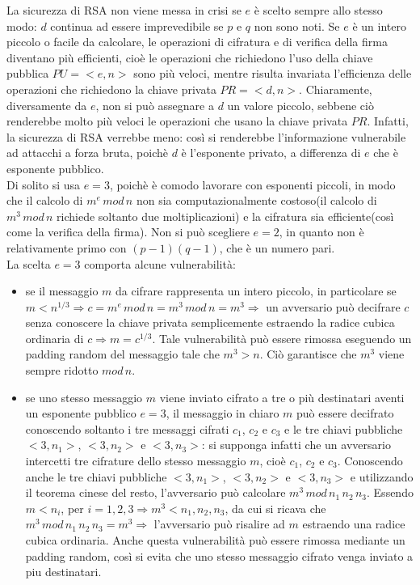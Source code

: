 La sicurezza di RSA non viene messa in crisi se $e$ è scelto sempre allo stesso modo: $d$ continua ad essere imprevedibile se $p$ e $q$ non sono noti. Se $e$ è un intero piccolo o facile da calcolare, le
operazioni di cifratura e di verifica della firma diventano più efficienti, cioè le operazioni che richiedono l'uso della chiave pubblica $PU = <e,n>$ sono più veloci, mentre risulta invariata l'efficienza delle operazioni che richiedono la chiave privata $PR = <d,n>$. Chiaramente, diversamente da $e$, non si può assegnare
a $d$ un valore piccolo, sebbene ciò renderebbe molto più veloci le operazioni che usano la chiave privata $PR$. Infatti, la sicurezza di RSA verrebbe meno: così si renderebbe l'informazione vulnerabile ad attacchi a forza bruta, poichè $d$ è l'esponente privato, a differenza di $e$ che è esponente pubblico.
\\ Di solito si usa $e=3$, poichè è comodo lavorare con esponenti piccoli, in modo che il calcolo di $m^e \, mod \, n$ non sia computazionalmente costoso(il calcolo di $ m^3 \, mod \, n$ richiede soltanto due moltiplicazioni) e la cifratura sia efficiente(così come la verifica della firma). Non si può scegliere $e=2$, in quanto non è relativamente primo con $(p-1)(q-1)$, che è un numero pari. \\
La scelta $e=3$ comporta alcune vulnerabilità: \begin{itemize}
\item se il messaggio $m$ da cifrare rappresenta un intero piccolo, in particolare se $m < n^{1/3} \Rightarrow  c = m^e \, mod \, n = m^3 \, mod \, n = m^3 \Rightarrow$ un avversario può decifrare $c$ senza conoscere la chiave privata semplicemente estraendo la radice
cubica ordinaria di $c \Rightarrow m = c^{1/3}$. Tale vulnerabilità può essere rimossa eseguendo un padding random del messaggio tale che $m^3 > n$. Ciò garantisce che $m^3$ viene sempre ridotto $ mod \, n $.
\item se uno stesso messaggio $m$ viene inviato cifrato a tre o più destinatari aventi un esponente pubblico $e=3$, il messaggio in chiaro $m$ può essere decifrato conoscendo soltanto i tre messaggi cifrati $c_{1}$, $c_{2}$ e $c_{3}$ e le tre chiavi pubbliche $<3,n_{1}>$, $<3,n_{2}>$ e $<3,n_{3}>$: si supponga infatti che un avversario intercetti tre cifrature dello stesso messaggio $m$, cioè $c_{1}$, $c_{2}$ e $c_{3}$. Conoscendo anche le tre chiavi pubbliche $<3,n_{1}>$, $<3,n_{2}>$ e $<3,n_{3}>$ e utilizzando il teorema cinese del resto, l'avversario può calcolare  $m^3 \, mod \, n_{1} \, n_{2} \, n_{3}$. Essendo $m<n_{i}$, per $i=1,2,3 \Rightarrow m^3<n_{1},n_{2},n_{3}$, da cui si ricava che $m^3 \, mod \, n_{1} \, n_{2} \, n_{3} = m^3 \Rightarrow$ l'avversario può risalire ad $m$ estraendo una radice cubica ordinaria. Anche questa vulnerabilità può essere rimossa
mediante un padding random, così si evita che uno stesso messaggio cifrato venga inviato a piu destinatari. 
\end{itemize}
